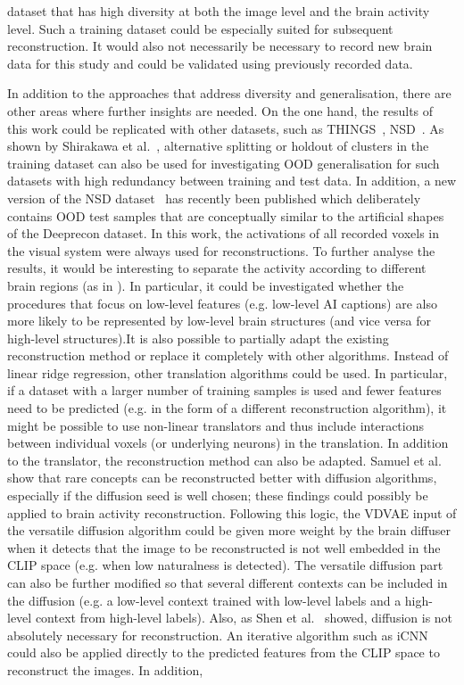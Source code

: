 dataset that has high diversity at both the image level and the brain activity level. Such a training dataset could be especially suited for subsequent reconstruction. It would also not necessarily be necessary to record new brain data for this study and could be validated using previously recorded data.

In addition to the approaches that  address diversity and generalisation, there are other areas where further insights are needed. On the one hand, the results of this work could be replicated with other datasets, such as THINGS~\cite{hebartTHINGSdataMultimodalCollection2023}, NSD~\cite{allenMassive7TFMRI2022}. As shown by Shirakawa et al.~\cite{shirakawaSpuriousReconstructionBrain2024}, alternative splitting or holdout of clusters in the training dataset can also be used for investigating OOD generalisation for such datasets with high redundancy between training and test data. In addition, a new version of the NSD dataset~\cite{gifford7TFMRIDataset2025} has recently been published which deliberately contains OOD test samples that are conceptually similar to the artificial shapes of the Deeprecon dataset. In this work, the activations of all recorded voxels in the visual system were always used for reconstructions. To further analyse the results, it would be interesting to separate the activity according to different brain regions (as in \cite{horikawaGenericDecodingSeen2017}). In particular, it could be investigated whether the procedures that focus on low-level features (e.g. low-level AI captions) are also more likely to be represented by low-level brain structures (and vice versa for high-level structures).It is also possible to partially adapt the existing reconstruction method or replace it completely with other algorithms. Instead of linear ridge regression, other translation algorithms could be used. In particular, if a dataset with a larger number of training samples is used and fewer features need to be predicted (e.g. in the form of a different reconstruction algorithm), it might be possible to use non-linear translators and thus include interactions between individual voxels (or underlying neurons) in the translation. In addition to the translator, the reconstruction method can also be adapted. Samuel et al.~\cite{samuelGeneratingImagesRare2024} show that rare concepts can be reconstructed better with diffusion algorithms, especially if the diffusion seed is well chosen; these findings could possibly be applied to brain activity reconstruction. Following this logic, the VDVAE input of the versatile diffusion algorithm could be given more weight by the brain diffuser when it detects that the image to be reconstructed is not well embedded in the CLIP space (e.g. when low naturalness is detected). The versatile diffusion part can also be further modified so that several different contexts can be included in the diffusion (e.g. a low-level context trained with low-level labels and a high-level context from high-level labels). Also, as Shen et al.~\cite{shenDeepImageReconstruction2019} showed, diffusion is not absolutely necessary for reconstruction. An iterative algorithm such as iCNN could also be applied directly to the predicted features from the CLIP space to reconstruct the images. In addition, 